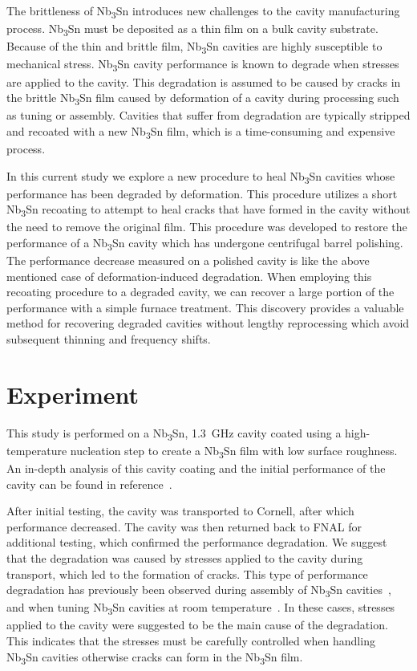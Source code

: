 \documentclass{revtex4-2}
\begin{document}
The brittleness of Nb\textsubscript{3}Sn introduces new challenges to the cavity manufacturing process. Nb\textsubscript{3}Sn must be deposited as a thin film on a bulk cavity substrate\cite{posen2017nb3sn, pudasaini2019growth, porter2018update}. Because of the thin and brittle film, Nb\textsubscript{3}Sn cavities are highly susceptible to mechanical stress. Nb\textsubscript{3}Sn cavity performance is known to degrade when stresses are applied to the cavity\cite{eremeev2023preservation, eremeev:srf2019-mop015}. This degradation is assumed to be caused by cracks in the brittle Nb\textsubscript{3}Sn film caused by deformation of a cavity during processing such as tuning or assembly. Cavities that suffer from degradation are typically stripped and recoated with a new Nb\textsubscript{3}Sn film, which is a time-consuming and expensive process.

In this current study we explore a new procedure to heal Nb\textsubscript{3}Sn cavities whose performance has been degraded by deformation. This procedure utilizes a short Nb\textsubscript{3}Sn recoating to attempt to heal cracks that have formed in the cavity without the need to remove the original film. This procedure was developed to restore the performance of a Nb\textsubscript{3}Sn cavity which has undergone centrifugal barrel polishing\cite{viklund2024improving}. The performance decrease measured on a polished cavity is like the above mentioned case of deformation-induced degradation. When employing this recoating procedure to a degraded cavity, we can recover a large portion of the performance with a simple furnace treatment. This discovery provides a valuable method for recovering degraded cavities without lengthy reprocessing which avoid subsequent thinning and frequency shifts.


\section{Experiment}
\label{sec:Experiment}

This study is performed on a Nb\textsubscript{3}Sn, \qty{1.3}{\giga\hertz} cavity coated using a high-temperature nucleation step to create a Nb\textsubscript{3}Sn film with low surface roughness. An in-depth analysis of this cavity coating and the initial performance of the cavity can be found in reference~\cite{posen2021advances}. 

After initial testing, the cavity was transported to Cornell, after which performance decreased. The cavity was then returned back to FNAL for additional testing, which confirmed the performance degradation. We suggest that the degradation was caused by stresses applied to the cavity during transport, which led to the formation of cracks. This type of performance degradation has previously been observed during assembly of Nb\textsubscript{3}Sn cavities~\cite{eremeev2023preservation}, and when tuning Nb\textsubscript{3}Sn cavities at room temperature~\cite{eremeev:srf2019-mop015}. In these cases, stresses applied to the cavity were suggested to be the main cause of the degradation. This indicates that the stresses must be carefully controlled when handling Nb\textsubscript{3}Sn cavities otherwise cracks can form in the Nb\textsubscript{3}Sn film.
\end{document}
